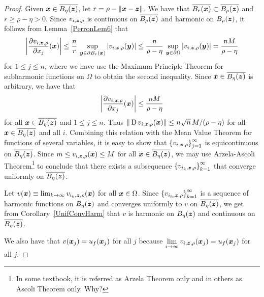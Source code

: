 \begin{proof}
 Given ${\bm{x}} \in \overline{B_\eta({\bm{z}})}$, let 
$r = \rho - \|{\bm{x}}-{\bm{z}}\|$.  We have that
$\displaystyle \overline{B_r({\bm{x}})} \subset \overline{B_\rho({\bm{z}})}$ and
$r\geq \rho-\eta>0$.  Since $v_{i,{\bm{z}},\rho}$ is continuous on
$\overline{B_\rho({\bm{z}})}$ and harmonic on $B_\rho({\bm{z}})$, it
follows from Lemma~\ref{PerronLem6} that
\[
\left|\frac{\partial{v_{i,{\bm{z}},\rho}}}{\partial x_j}({\bm{x}})\right|
\leq \frac{n}{r}\, \sup_{{\bm{y}} \in \partial B_r({\bm{x}})}
|v_{i,{\bm{z}},\rho}({\bm{y}})|
\leq \frac{n}{\rho-\eta}\, \sup_{{\bm{y}} \in \partial \Omega}
|v_{i,{\bm{z}},\rho}({\bm{y}})| = \frac{nM}{\rho-\eta}
\]
for $1 \leq j \leq n$, where we have use the Maximum Principle Theorem
for subharmonic functions on $\Omega$ to obtain the second inequality.
Since ${\bm{x}} \in \overline{B_\eta({\bm{z}})}$ is arbitrary,
we have that
\[
\left|\frac{\partial{v_{i,{\bm{z}},\rho}}}{\partial x_j}({\bm{x}})\right|
\leq \frac{nM}{\rho-\eta}
\]
for all ${\bm{x}} \in \overline{B_\eta({\bm{z}})}$ and
$1 \leq j \leq n$.  Thus
$\|\operatorname{D} v_{i,{\bm{z}},\rho} ({\bm{x}})\| \leq n\sqrt{n}\,M/(\rho-\eta)$ for all
${\bm{x}} \in \overline{B_\eta({\bm{z}})}$ and all $i$.  Combining this
relation with the Mean Value Theorem for functions of several
variables, it is easy to show that
$\displaystyle \left\{ v_{i,{\bm{z}},\rho} \right\}_{j=1}^\infty$ is
equicontinuous on $\overline{B_\eta({\bm{z}})}$.  Since
$m \leq v_{i,{\bm{z}},\rho} ({\bm{x}}) \leq M$ for all
${\bm{x}} \in \overline{B_\eta({\bm{z}})}$, we may use Arzela-Ascoli
Theorem\footnote{In some textbook, it is referred as
Arzela Theorem only and in others as Ascoli Theorem only.  Why?}
to conclude that there exists a subsequence 
$\displaystyle \left\{ v_{i_k,{\bm{z}},\rho} \right\}_{k=1}^\infty$
that converge uniformly on 
$\overline{B_\eta({\bm{z}})}$.

Let $v({\bm{x}}) \equiv \lim_{k\to \infty} v_{i_k,{\bm{z}},\rho}({\bm{x}})$
for all ${\bm{x}} \in \Omega$.  Since
$\displaystyle \left\{v_{i_k,{\bm{z}},\rho}\right\}_{k=1}^\infty$ is a
sequence of harmonic functions on $B_\eta({\bm{z}})$ and converges
uniformly to $v$ on $\overline{B_\eta({\bm{z}})}$, we get from
Corollary~\ref{UnifConvHarm} that $v$ is harmonic on $B_\eta({\bm{z}})$
and continuous on $\overline{B_\eta({\bm{z}})}$.

We also have that $v({\bm{x}}_j) = u_f({\bm{x}}_j)$ for all $j$ because
$\displaystyle \lim_{i \to \infty} v_{i,{\bm{z}},\rho}({\bm{x}}_j)
= u_f({\bm{x}}_j)$ for all $j$.


\end{proof}
